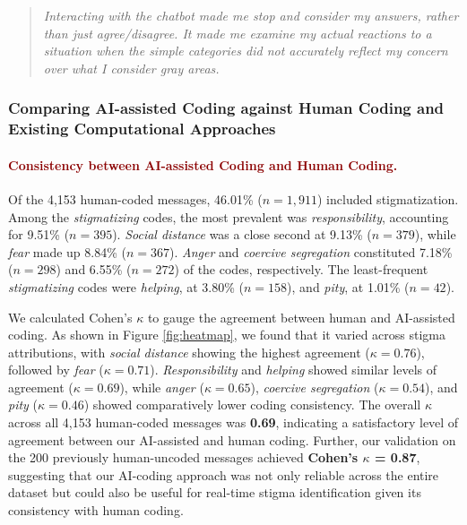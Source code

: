 \begin{quote}
    \textit{Interacting with the chatbot made me stop and consider my answers, rather than just agree/disagree. It made me examine my actual reactions to a situation when the simple categories did not accurately reflect my concern over what I consider gray areas.}
\end{quote}




\subsubsection{Comparing AI-assisted Coding against Human Coding and Existing Computational Approaches}





\paragraph{\textcolor{darkred}{\textbf{Consistency between AI-assisted Coding and Human Coding.}}}

Of the 4,153 human-coded messages, 46.01\% ($n=1,911$) included stigmatization.
Among the \textit{stigmatizing} codes, the most prevalent was \textit{responsibility}, accounting for 9.51\% ($n=395$). 
\textit{Social distance} was a close second at 9.13\% ($n=379$), while \textit{fear} made up 8.84\% ($n=367$). 
\textit{Anger} and \textit{coercive segregation} constituted 7.18\% ($n=298$) and 6.55\% ($n=272$) of the codes, respectively. 
The least-frequent \textit{stigmatizing} codes were \textit{helping}, at 3.80\% ($n=158$), and \textit{pity}, at 1.01\% ($n=42$). 


We calculated Cohen's $\kappa$ to gauge the agreement between human and AI-assisted coding. 
As shown in Figure \ref{fig:heatmap}, we found that it varied across stigma attributions, with \textit{social distance} showing the highest agreement ($\kappa=0.76$), followed by \textit{fear} ($\kappa=0.71$). 
\textit{Responsibility} and \textit{helping} showed similar levels of agreement ($\kappa=0.69$), while \textit{anger} ($\kappa=0.65$), \textit{coercive segregation} ($\kappa=0.54$), and \textit{pity} ($\kappa=0.46$) showed comparatively lower coding consistency.
The overall $\kappa$ across all 4,153 human-coded messages was \textbf{0.69}, indicating a satisfactory level of agreement \cite{cohens_kappa_mchugh_2012} between our AI-assisted and human coding. 
Further, our validation on the 200 previously human-uncoded messages achieved \textbf{Cohen's $\kappa$ = 0.87}, suggesting that our AI-coding approach was not only reliable across the entire dataset but could also be useful for real-time stigma identification given its consistency with human coding.

